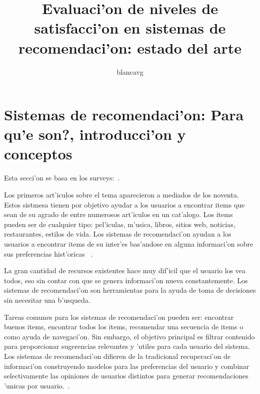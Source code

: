 \documentclass[11pt]{article}
\begin{document}
\title{Evaluaci'on de niveles de satisfacci'on en sistemas de recomendaci'on: estado del arte}
\author{blancavg}

\maketitle
\section{Sistemas de recomendaci'on: \textquestiondown Para qu'e son?, introducci'on y conceptos}
Esta secci'on se basa en los surveys:~\cite{recsys:alban,start:candillier09,recsys:nlathia}.

\medskip
Los primeros art'iculos sobre el tema aparecieron a mediados de los noventa. Estos sistmesa tienen por objetivo ayudar a los usuarios a encontrar items que sean de su agrado de entre numerosos art'iculos en un cat'alogo. Los items pueden ser de cualquier tipo: pel'iculas, m'usica, libros, sitios web, noticias, restaurantes, estilos de vida. Los sistemas de recomendaci'on ayudan a los usuarios a encontrar items de su inter'es bas'andose en alguna informaci'on sobre sus preferencias hist'oricas ~\cite{start:candillier09}.

La gran cantidad de recursos existentes hace muy dif'icil que el usuario los vea todos, eso sin contar con que se genera informaci'on nueva constantemente. Los sistemas de recomendaci'on son herramientas para la ayuda de toma de decisiones sin necesitar una b'usqueda. 

Tareas comunes para los sistemas de recomendaci'on pueden ser: encontrar buenos items, encontrar todos los items, recomendar una secuencia de items o como ayuda de navegaci'on. Sin embargo, el objetivo principal es filtrar contenido para proporcionar sugerencias relevantes y 'utiles para cada usuario del sistema. Los sistemas de recomendaci'on difieren de la tradicional recuperaci'on de informaci'on construyendo modelos para las preferencias del usuario y combinar selectivamente las opiniones de usuarios distintos para generar recomendaciones 'unicas por usuario.~\cite{recsys:nlathia}.
\end{document}
